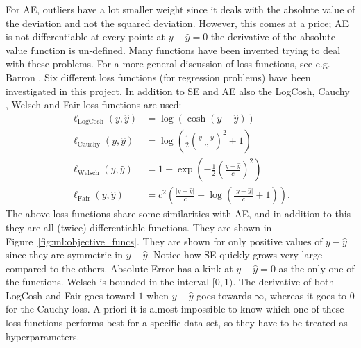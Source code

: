 \documentclass[a4paper, twoside, nobib]{tufte-book}
\newcommand{\abs}[1]{\lvert#1\rvert}
\begin{document}
For AE, outliers have a lot smaller weight since it deals with the absolute value of the deviation and not the squared deviation. However, this comes at a price; AE is not differentiable at every point: at $y-\hat{y} = 0$ the derivative of the absolute value function is un-defined. Many functions have been invented trying to deal with these problems. For a more general discussion of loss functions, see e.g. Barron \citep{barronGeneralAdaptiveRobust2017}. Six different loss functions (for regression problems) have been investigated in this project. In addition to SE and AE also the LogCosh, Cauchy  \citep{barronGeneralAdaptiveRobust2017}, Welsch  \citep{barronGeneralAdaptiveRobust2017} and Fair  \citep{AllstateClaimsSeverity} loss functions are used:
\begin{equation}
  \begin{split}
    \ell_\mathrm{LogCosh}(y, \hat{y})  &= \log\left( \cosh\left( y-\hat{y} \right) \right) \\
    \ell_\mathrm{Cauchy}(y, \hat{y})  &= \log\left( \frac{1}{2} \left(\frac{y-\hat{y}}{c}\right)^2 + 1   \right) \\
    \ell_\mathrm{Welsch}(y, \hat{y})  &=  1 - \exp\left( - \frac{1}{2} \left(\frac{y-\hat{y}}{c}\right)^2  \right)\\
    \ell_\mathrm{Fair}(y, \hat{y})  &= c^2  \left( \frac{\abs{y-\hat{y}} }{c}  - \log \left(\frac{\abs{y-\hat{y}}}{c} +1 \right )   \right). 
  \end{split}
\end{equation}
The above loss functions share some similarities with AE, and in addition to this they are all (twice) differentiable functions. They are shown in Figure~\ref{fig:ml:objective_funcs}. They are shown for only positive values of $y-\hat{y}$ since they are symmetric in $y-\hat{y}$. Notice how SE quickly grows very large compared to the others. Absolute Error has a kink at $y-\hat{y}=0$ as the only one of the functions. Welsch is bounded in the interval $[0, 1)$. The derivative of both LogCosh and Fair goes toward $1$ when $y-\hat{y}$ goes towards $\infty$, whereas it goes to 0 for the Cauchy loss. A priori it is almost impossible to know which one of these loss functions performs best for a specific data set, so they have to be treated as hyperparameters. 
\end{document}
